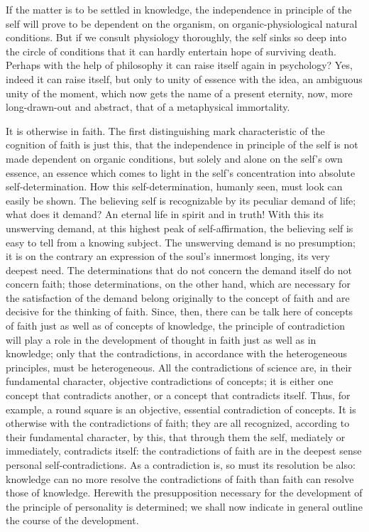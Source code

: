 \documentclass[12pt]{book}
\newcommand{\opage}[1]{\marginnote{\footnotesize\textit{[#1]}}}
\begin{document}
If the matter is to be settled in knowledge, the independence in
principle of the self will prove to be dependent on the organism, on
organic-physiological natural conditions. But if we consult physiology
thoroughly, the self sinks so deep into the circle of conditions that it
can hardly entertain hope of surviving death. Perhaps with the help of
philosophy it can raise itself again in psychology? Yes, indeed it can
raise itself, but only to unity of essence with the idea, an ambiguous
unity of the moment, which now gets the name of a present eternity, now,
more long-drawn-out and abstract, that of a metaphysical immortality.

It is otherwise in faith. The first distinguishing mark characteristic
of the cognition of faith is just this, that the independence in
principle of the self is not made dependent on organic conditions, but
solely and alone on the self's own essence, an essence which comes to
light in the self's concentration into absolute self-determination. How
this self-determination, humanly seen, must look can easily be shown.
The believing self is recognizable by its peculiar demand of life; what
does it demand? An eternal life in spirit and in truth! With this its
unswerving demand, at this highest peak of self-affirmation, the
believing self is easy to tell from a knowing subject.
\opage{140}\setcounter{footnote}{0}%
The unswerving demand is no presumption; it is on the contrary an
expression of the soul's innermost longing, its very deepest need. The
determinations that do not concern the demand itself do not concern
faith; those determinations, on the other hand, which are necessary for
the satisfaction of the demand belong originally to the concept of faith
and are decisive for the thinking of faith. Since, then, there can be
talk here of concepts of faith just as well as of concepts of knowledge,
the principle of contradiction will play a role in the development of
thought in faith just as well as in knowledge; only that the
contradictions, in accordance with the heterogeneous principles, must be
heterogeneous. All the contradictions of science are, in their
fundamental character, objective contradictions of concepts; it is
either one concept that contradicts another, or a concept that
contradicts itself. Thus, for example, a round square is an objective,
essential contradiction of concepts. It is otherwise with the
contradictions of faith; they are all recognized, according to their
fundamental character, by this, that through them the self, mediately
or immediately, contradicts itself: the contradictions of faith are in
the deepest sense personal self-contradictions. As a contradiction is,
so must its resolution be also: knowledge can no more resolve the
contradictions of faith than faith can resolve those of knowledge.
Herewith the presupposition necessary for the development of the
principle of personality is determined; we shall now indicate in general
outline the course of the development.
\end{document}

